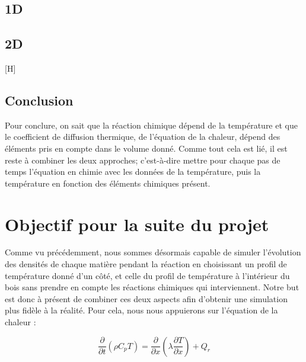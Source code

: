 \documentclass[a4paper,11pt]{article}
\begin{document}
\subsection{1D}

\subsection{2D}

\begin{figure}[H]
\end{figure}
  
\begin{figure}[H]
\end{figure}
\begin{figure}[H]
\end{figure}[H]

\subsection{Conclusion}

Pour conclure, on sait que la réaction chimique dépend de la température et que le coefficient de diffusion thermique, de l'équation de la chaleur, dépend des éléments pris en compte dans le volume donné. Comme tout cela est lié, il est reste à combiner les deux approches; c'est-à-dire mettre pour chaque pas de temps l'équation en chimie avec les données de la température, puis la température en fonction des éléments chimiques présent.

\section{Objectif pour la suite du projet}

Comme vu précédemment, nous sommes désormais capable de simuler l'évolution des densités de chaque matière pendant la réaction en choisissant un profil de température donné d'un côté, et celle du profil de température à l'intérieur du bois sans prendre en compte les réactions chimiques qui interviennent. Notre but est donc à présent de combiner ces deux aspects afin d'obtenir une simulation plus fidèle à la réalité. Pour cela, nous nous appuierons sur l'équation de la chaleur :

\begin{equation}\label{eq:10}
    \frac \partial{\partial t} (\rho C_p T) = \frac{\partial}{\partial x} (\lambda \frac{\partial T}{\partial x}) + Q_r
\end{equation}
\end{document}
